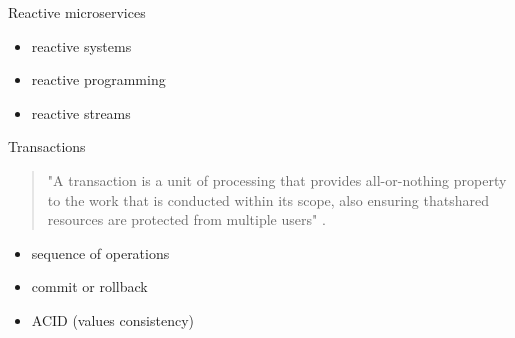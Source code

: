 \documentclass{beamer}
\begin{document}
    \begin{frame}{Reactive microservices}
       \begin{itemize}
           \item reactive systems
           \item reactive programming
           \item reactive streams
       \end{itemize}
    \hfill \break
    \hfill \break
    \hfill \break
    \hfill \break
    \hfill \break
    \hfill \break
    \hfill \break
    \end{frame}

    \begin{frame}{Transactions}
    
     \begin{quotation}
         \begin{center}
             "A transaction is a unit of processing that provides all-or-nothing property to the work that is conducted within its scope, also ensuring thatshared resources are protected from multiple users" \cite{java_transaction_processing}.
         \end{center}
     \end{quotation}
     \Large
        \begin{itemize}
            \item sequence of operations
            \item commit or rollback
            \item ACID (values consistency)
        \end{itemize}
        \hfill \break
        \hfill \break
        \hfill \break       
    \end{frame}
\end{document}

